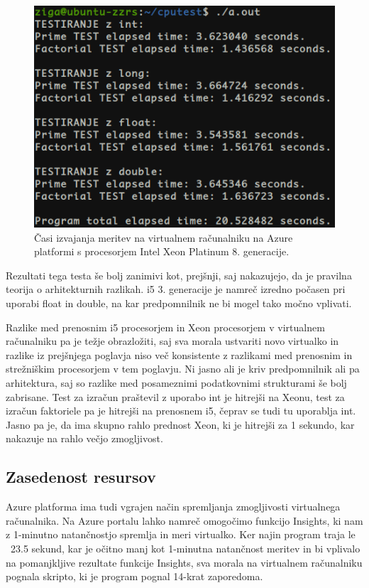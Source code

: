 \begin{figure}[H]
	\centering
	\includegraphics[scale=0.55]{Img/Azure_cputest2.png}
	\caption{Časi izvajanja meritev na virtualnem računalniku na Azure platformi s procesorjem Intel Xeon Platinum 8. generacije.}
	\label{fig:7_breme2}
\end{figure}

Rezultati tega testa še bolj zanimivi kot, prejšnji, saj nakazujejo, da je pravilna teorija o arhitekturnih razlikah. i5 3. generacije je namreč izredno počasen pri uporabi float in double, na kar predpomnilnik ne bi mogel tako močno vplivati.

Razlike med prenosnim i5 procesorjem in Xeon procesorjem v virtualnem računalniku pa je težje obrazložiti, saj sva morala ustvariti novo virtualko in razlike iz prejšnjega poglavja niso več konsistente z razlikami med prenosnim in strežniškim procesorjem v tem poglavju. Ni jasno ali je kriv predpomnilnik ali pa arhitektura, saj so razlike med posameznimi podatkovnimi strukturami še bolj zabrisane. Test za izračun praštevil z uporabo int je hitrejši na Xeonu, test za izračun faktoriele pa je hitrejši na prenosnem i5, čeprav se tudi tu uporablja int. Jasno pa je, da ima skupno rahlo prednost Xeon, ki je hitrejši za 1 sekundo, kar nakazuje na rahlo večjo zmogljivost.



\subsection{Zasedenost resursov}

Azure platforma ima tudi vgrajen način spremljanja zmogljivosti virtualnega računalnika. Na Azure portalu lahko namreč omogočimo funkcijo Insights, ki nam z 1-minutno natančnostjo spremlja in meri virtualko. Ker najin program traja le ~23.5 sekund, kar je očitno manj kot 1-minutna natančnost meritev in bi vplivalo na pomanjkljive rezultate funkcije Insights, sva morala na virtualnem računalniku pognala skripto, ki je program pognal 14-krat zaporedoma.

